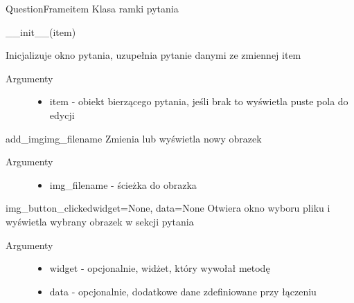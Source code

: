 \documentclass[letterpaper,10pt,polish]{manual}
\begin{document}
\hypertarget{QuestionFrame.QuestionFrame}{}\begin{classdesc}{QuestionFrame}{item}
Klasa ramki pytania

\_\_init\_\_(item)

Inicjalizuje okno pytania, uzupełnia pytanie danymi ze zmiennej item
\begin{description}
\item[Argumenty] \leavevmode\begin{itemize}
\item {} 
item - obiekt bierzącego pytania, jeśli brak to wyświetla puste pola do edycji

\end{itemize}

\end{description}

\hypertarget{QuestionFrame.QuestionFrame.add\_img}{}\begin{methoddesc}{add\_img}{img\_filename}
Zmienia lub wyświetla nowy obrazek
\begin{description}
\item[Argumenty] \leavevmode\begin{itemize}
\item {} 
img\_filename - ścieżka do obrazka

\end{itemize}

\end{description}
\end{methoddesc}

\hypertarget{QuestionFrame.QuestionFrame.img\_button\_clicked}{}\begin{methoddesc}{img\_button\_clicked}{widget=None, data=None}
Otwiera okno wyboru pliku i wyświetla wybrany obrazek w sekcji pytania
\begin{description}
\item[Argumenty] \leavevmode\begin{itemize}
\item {} 
widget - opcjonalnie, widżet, który wywołał metodę

\item {} 
data  - opcjonalnie, dodatkowe dane zdefiniowane przy łączeniu

\end{itemize}

\end{description}
\end{methoddesc}


\end{classdesc}
\end{document}
